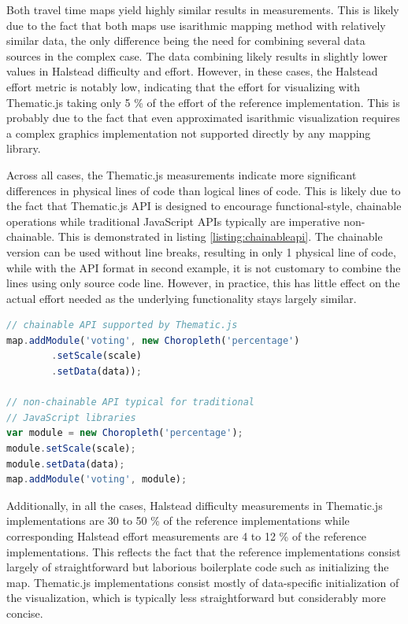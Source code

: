 Both travel time maps yield highly similar results in measurements. This is likely due to the fact that both maps use isarithmic mapping method with relatively similar data, the only difference being the need for combining several data sources in the complex case. The data combining likely results in slightly lower values in Halstead difficulty and effort. However, in these cases, the Halstead effort metric is notably low, indicating that the effort for visualizing with Thematic.js taking only 5 \% of the effort of the reference implementation. This is probably due to the fact that even approximated isarithmic visualization requires a complex graphics implementation not supported directly by any mapping library.

Across all cases, the Thematic.js measurements indicate more significant differences in physical lines of code than logical lines of code. This is likely due to the fact that Thematic.js API is designed to encourage functional-style, chainable operations while traditional JavaScript APIs typically are imperative non-chainable. This is demonstrated in listing \ref{listing:chainableapi}. The chainable version can be used without line breaks, resulting in only 1 physical line of code, while with the API format in second example, it is not customary to combine the lines using only source code line. However, in practice, this has little effect on the actual effort needed as the underlying functionality stays largely similar.

\begin{lstlisting}[caption=Thematic.js API format. The code has been simplified to increase readability.,language=JavaScript,label=listing:chainableapi]
// chainable API supported by Thematic.js
map.addModule('voting', new Choropleth('percentage')
        .setScale(scale)
        .setData(data));

// non-chainable API typical for traditional 
// JavaScript libraries
var module = new Choropleth('percentage');
module.setScale(scale);
module.setData(data);
map.addModule('voting', module);
\end{lstlisting}

Additionally, in all the cases, Halstead difficulty measurements in Thematic.js implementations are 30 to 50 \% of the reference implementations while corresponding Halstead effort measurements are 4 to 12 \% of the reference implementations. This reflects the fact that the reference implementations consist largely of straightforward but laborious boilerplate code such as initializing the map. Thematic.js implementations consist mostly of data-specific initialization of the visualization, which is typically less straightforward but considerably more concise.

